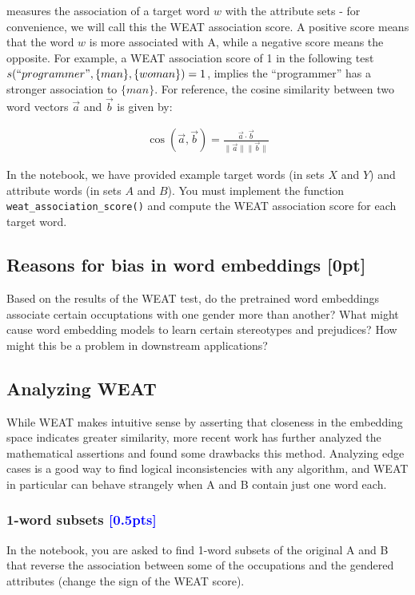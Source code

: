 measures the association of a target word \(w\) with the attribute sets - for convenience, we will call this the WEAT association score. A positive score means that the word $w$ is more associated with A, while a negative score means the opposite. For example, a WEAT association score of 1 in the following test $s(``programmer", \{man\}, \{woman\})=1$, implies the ``programmer'' has a stronger association to $\{man\}$. For reference, the cosine similarity between two word vectors \(\vec{a}\) and \(\vec{b}\) is given by:

\begin{align}
    \cos(\vec{a}, \vec{b}) = \frac{\vec{a} \cdot \vec{b}}{\parallel \vec{a} \parallel  \parallel \vec{b} \parallel}
\end{align}

In the notebook, we have provided example target words (in sets \(X\) and \(Y\)) and attribute words (in sets \(A\) and \(B\)). You must implement the function \verb+weat_association_score()+ and compute the WEAT association score for each target word. 

\subsection{Reasons for bias in word embeddings [0pt] \LII}

Based on the results of the WEAT test, do the pretrained word embeddings associate certain occuptations with one gender more than another? What might cause word embedding models to learn certain stereotypes and prejudices? How might this be a problem in downstream applications?

\subsection{Analyzing WEAT}

While WEAT makes intuitive sense by asserting that closeness in the embedding space indicates greater similarity, more recent work \cite{ethayarajh2019understanding} has further analyzed the mathematical assertions and found some drawbacks this method. Analyzing edge cases is a good way to find logical inconsistencies with any algorithm, and WEAT in particular can behave strangely when A and B contain just one word each. 
 
\subsubsection{1-word subsets \textcolor{blue}{[0.5pts]} \LIV} In the notebook, you are asked to find 1-word subsets of the original A and B that reverse the association between some of the occupations and the gendered attributes (change the sign of the WEAT score).


